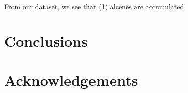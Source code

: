\documentclass[preprint,review,12pt]{elsarticle}
\begin{document}
From our dataset, we see that (1) alcenes are accumulated

\section{Conclusions}


\section{Acknowledgements}







\end{document}
